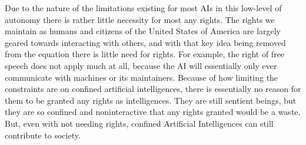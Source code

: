 Due to the nature of the limitations existing for most AIs in this low-level of autonomy there is rather little necessity for most any rights. The rights we maintain as humans and citizens of the United States of America are largely geared towards interacting with others, and with that key idea being removed from the equation there is little need for rights. For example, the right of free speech does not apply much at all, because the AI will essentially only ever communicate with machines or its maintainers. Because of how limiting the constraints are on confined artificial intelligences, there is essentially no reason for them to be granted any rights as intelligences. They are still sentient beings, but they are so confined and noninteractive that any rights granted would be a waste. But, even with not needing rights, confined Artificial Intelligences can still contribute to society.
